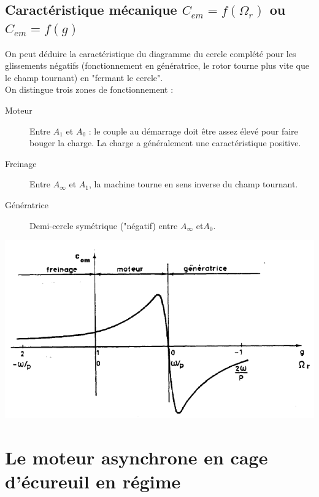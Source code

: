 		
		
	\subsection{Caractéristique mécanique $C_{em} = f(\Omega_r)$ ou $C_{em} = f(g)$}
	On peut déduire la caractéristique du diagramme du cercle complété pour les glissements 
	négatifs (fonctionnement en génératrice, le rotor tourne plus vite que le champ tournant) en 
	"fermant le cercle".\\
	On distingue trois zones de fonctionnement :
	\begin{description}
	\item[Moteur] Entre $A_1$ et $A_0$ : le couple au démarrage doit être assez élevé pour faire 
	bouger la charge. La charge a généralement une caractéristique positive.
	\item[Freinage] Entre $A_\infty$ et $A_1$, la machine tourne en sens inverse du champ tournant.
	\item[Génératrice] Demi-cercle symétrique ("négatif) entre $A_\infty$ et$ A_0$.
	\end{description}
			\begin{center}
		\includegraphics[scale=0.4]{ch5/image31.png}
		\end{center}



\section{Le moteur asynchrone en cage d’écureuil en régime}














	
	
	
	
	
	
	
	
	
	
	